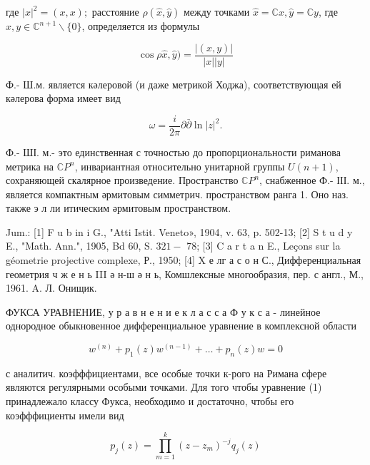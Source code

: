 \documentclass[10pt]{article}
\begin{document}
где $|x|^{2}=(x, x) ;$ расстояние $\rho(\hat{x}, \hat{y})$ между точками $\widehat{x}=\mathbb{C} x, \hat{y}=\mathbb{C} y$, где $x, y \in \mathbb{C}^{n+1} \backslash\{0\}$, определяется из формулы



\[

\cos \rho \hat{x}, \hat{y})=\frac{|(x, y)|}{|x||y|}

\]



Ф.- Ш.м. является кәлеровой (и даже метрикой Ходжа), соответствующая ей кәлерова форма имеет вид



\[

\omega=\frac{i}{2 \pi} \partial \bar{\partial} \ln |z|^{2} .

\]



Ф.- ШІ. м.- это единственная с точностью до пропорциональности риманова метрика на $\mathbb{C} P^{n}$, инвариантная относительно унитарной группы $U(n+1)$, сохраняющей скалярное произведение. Пространство $\mathbb{C} P^{n}$, снабженное Ф.- ІІІ. м., является компактным әрмитовым симметрич. пространством ранга 1. Оно наз. также э л ли итическим әрмитовым пространством.



Jum.: [1] F u b in i G., "Atti Istit. Veneto», 1904, v. 63, p. 502-13; [2] S t u d y E., "Math. Ann.", 1905, Bd 60, S. $321-$ 78; [3] C a r t a n E., Leçons sur la géometrie projective complexe, Р., 1950; [4] X е лг а с о н С., Дифференциальная геометрия ч ж е н ь III ә н-ш ә н ь, Комшлексные многообразия, пер. с англ., М., 1961. A. Л. Онищик.



ФУКСА УРАВНЕНИЕ, у р а в н е н и е к л а с с а Ф у к с а - линейное однородное обыкновенное дифференциальное уравнение в комплексной области



\[

w^{(n)}+p_{1}(z) w^{(n-1)}+\ldots+p_{n}(z) w=0

\]



с аналитич. коэфффициентами, все особые точки к-рого на Римана сфере являются регулярными особыми точками. Для того чтобы уравнение (1) принадлежало классу Фукса, необходимо и достаточно, чтобы его коэфффициенты имели вид



\[

p_{j}(z)=\prod_{m=1}^{k}\left(z-z_{m}\right)^{-j} q_{j}(z)

\]
\end{document}
